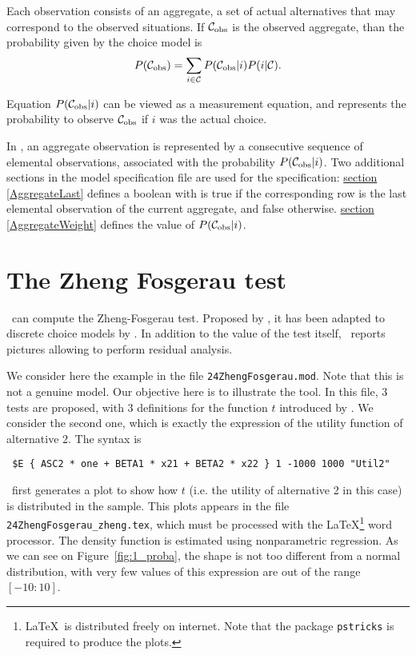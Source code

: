\documentclass[12pt]{memoir}
\begin{document}
Each observation consists of an aggregate, a set of actual
alternatives that may correspond to the observed situations.  If $\mathcal{C}_\text{obs}$ is the observed aggregate, than the
probability given by the choice model is
\begin{equation}
\label{eq:latentChoice}
P(\mathcal{C}_\text{obs}) = \sum_{i\in \mathcal{C}} P(\mathcal{C}_\text{obs}|i) P(i | \mathcal{C}).
\end{equation}

Equation $P(\mathcal{C}_\text{obs}|i)$ can be viewed as a measurement equation,
and represents the probability to observe $\mathcal{C}_\text{obs}$ if $i$ was
the actual choice. 

In \BIOGEME , an aggregate observation is represented by a consecutive
sequence of elemental observations, associated with the probability
$P(\mathcal{C}_\text{obs}|i)$.
Two additional sections in the model specification file are used for the specification: \hyperlink{AggregateLast}{section [AggregateLast]} defines a boolean with is true if the corresponding row is the last elemental observation of the current aggregate, and false otherwise. \hyperlink{AggregateWeight}{section [AggregateWeight]} defines the value of $P(\mathcal{C}_\text{obs}|i)$.

\section{The Zheng Fosgerau test}
\label{sec:zhengFosgerau}

\BIOSIM\ can compute the Zheng-Fosgerau test. Proposed by
, it has been adapted to discrete choice models by
. In addition to the value of the test itself,
\BIOSIM\ reports pictures allowing to perform residual analysis. 

We consider here the example in the file
\verb+24ZhengFosgerau.mod+. Note that this is not a genuine model. Our
objective here is to illustrate the tool. In this file, 3 tests are
proposed, with 3 definitions for the function $t$ introduced by
. We consider the second one, which is exactly the
expression of the utility function of alternative 2. The syntax is 
{\footnotesize
\begin{verbatim}
 $E { ASC2 * one + BETA1 * x21 + BETA2 * x22 } 1 -1000 1000 "Util2" 
\end{verbatim}
}
\BIOSIM\ first generates a plot to show how $t$ (i.e. the utility of
alternative 2 in this case) is distributed in the
sample. This plots appears in the file
\texttt{24ZhengFosgerau\_zheng.tex}, which must be processed with the
\LaTeX\footnote{\LaTeX\ is distributed freely on internet. Note that the package \texttt{pstricks} is required to produce the plots.} word processor. The density function is estimated using nonparametric
regression. As we can see on Figure~\ref{fig:1_proba}, the shape is
not too different from a normal distribution, with very few values of
this expression are out
of the range $[-10:10]$.
\end{document}
